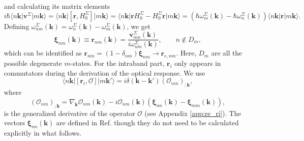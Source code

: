 and calculating its matrix elements
\begin{equation}\label{conhrnm}
i\hbar\langle n\mathbf{k}\vert\mathbf{v}^\Sigma\vert m\mathbf{k}\rangle
= \langle n\mathbf{k}\vert
  \left[\mathbf{r},H^{\Sigma}_{0}\right]
  \vert m\mathbf{k}\rangle
= \langle n\mathbf{k}\vert
  \mathbf{r}H^{\Sigma}_{0} - H^{\Sigma}_{0}\mathbf{r}
  \vert m\mathbf{k}\rangle
= \left(
  \hbar\omega^{\Sigma}_{m}(\mathbf{k}) - \hbar\omega^{\Sigma}_{n}(\mathbf{k})
  \right)
  \langle n\mathbf{k}\vert\mathbf{r}\vert m\mathbf{k}\rangle.
\end{equation}
Defining $\omega^\Sigma_{nm}(\mathbf{k}) =
\omega^{\Sigma}_{n}(\mathbf{k}) - \omega^\Sigma_m(\mathbf{k})$, we get
\begin{equation}\label{pmnrmn}
\boldsymbol{\xi}_{nm}(\mathbf{k})\equiv
\mathbf{r}_{nm}(\mathbf{k})
= \frac{\mathbf{v}^\Sigma_{nm}(\mathbf{k})}{i\omega^\Sigma_{nm}(\mathbf{k})},
\qquad n\notin D_{m},
\end{equation} 
which can be identified as
$\mathbf{r}_{nm}=(1-\delta_{nm})\boldsymbol{\xi}_{nm}\to \mathbf{r}_{e,nm}$.
Here, $D_m$ are all the possible degenerate $m$-states. For the intraband part,
$\mathbf{r}_i$ only appears in commutators during the derivation of the optical
response. We use \cite{aversaPRB95}
\begin{equation}\label{conmri3n}
\langle n\mathbf{k}\vert
\left[\mathbf{r}_{i},\mathcal{O}\right]
\vert m\mathbf{k}'\rangle
= i\delta(\mathbf{k} - \mathbf{k}')(\mathcal{O}_{nm})_{;\mathbf{k}},
\end{equation}  
where
\begin{equation}\label{gendevnn}
(\mathcal{O}_{nm})_{;\mathbf{k}} =
  \nabla_{\mathbf{k}}\mathcal{O}_{nm}(\mathbf{k})
- i\mathcal{O}_{nm}(\mathbf{k})
\left(
\boldsymbol{\xi}_{nn}(\mathbf{k}) - \boldsymbol{\xi}_{mm}(\mathbf{k})
\right),
\end{equation} 
is the generalized derivative of the operator $\mathcal{O}$ (see Appendix
\ref{app:re_ri}). The vectors $\boldsymbol{\xi}_{nn}(\mathbf{k})$ are defined in 
Ref. \cite{aversaPRB95} though they do not need to be calculated explicitly in
what follows.


